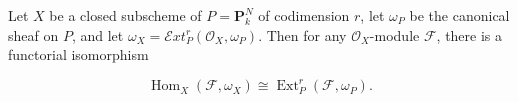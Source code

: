 Let $X$ be a closed subscheme of $P = \mathbf{P}_k^N$ of codimension $r$, let $\omega_P$ be the canonical sheaf on $P$, and let $\omega_X = \mathcal{E}xt^r_P(\mathcal{O}_X, \omega_P)$. Then for any $\mathcal{O}_X$-module $\mathcal{F}$, there is a functorial isomorphism

$$\operatorname{Hom}_X(\mathcal{F}, \omega_X) \cong \operatorname{Ext}^r_P(\mathcal{F}, \omega_P).$$
